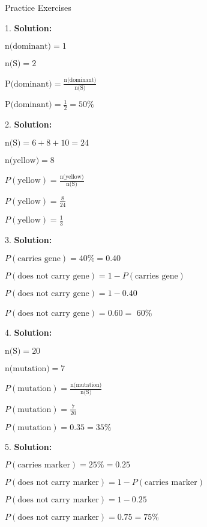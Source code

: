 \documentclass{article}
\begin{document}
Practice Exercises

1. \textbf{Solution:}

$ \text{n(dominant)} = 1 $

$ \text{n(S)} = 2 $

$
\text{P(dominant)} = \frac{\text{n(dominant)}}{\text{n(S)}}
$

$
\text{P(dominant)} = \frac{1}{2} =  50\% 
$

 

2. \textbf{Solution:}


$ \text{n(S)} = 6 + 8 + 10 = 24 $

$ \text{n(yellow)} = 8 $

$
P(\text{yellow}) = \frac{\text{n(yellow)}}{\text{n(S)}}
$

$
P(\text{yellow}) = \frac{8}{24}
$

$
P(\text{yellow}) = \frac{1}{3}
$

3. \textbf{Solution:}

$
P(\text{carries gene}) = 40\% = 0.40
$

$
P(\text{does not carry gene}) = 1 - P(\text{carries gene})
$

$
P(\text{does not carry gene}) = 1 - 0.40
$

$
P(\text{does not carry gene}) = 0.60 = $ 60\% $
$

4. \textbf{Solution:}

$
\text{n(S)} = 20
$

$
\text{n(mutation)} = 7
$

$
P(\text{mutation}) = \frac{\text{n(mutation)}}{\text{n(S)}}
$

$
P(\text{mutation}) = \frac{7}{20}
$

$
P(\text{mutation}) = 0.35 = 35\%
$


5. \textbf{Solution:}
 
$
P(\text{carries marker}) = 25\% = 0.25
$

$
P(\text{does not carry marker}) = 1 - P(\text{carries marker})
$

$
P(\text{does not carry marker}) = 1 - 0.25
$

$
P(\text{does not carry marker}) = 0.75 = 75\%
$
\end{document}
